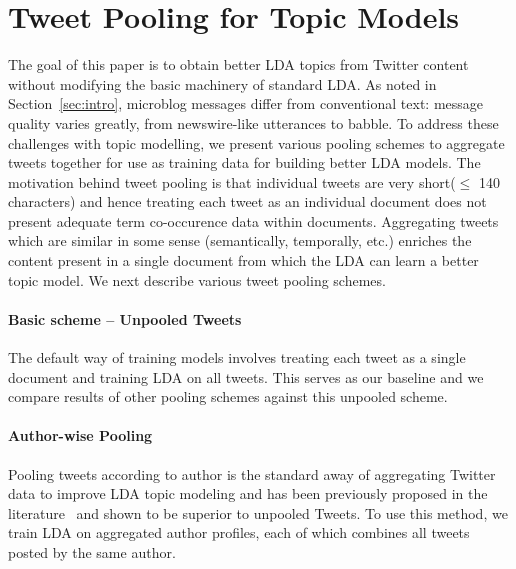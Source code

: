 \documentclass{sig-alternate}
\begin{document}

\section{Tweet Pooling for Topic Models}

The goal of this paper is to obtain better LDA topics from Twitter
content without modifying the basic machinery of standard LDA.  As
noted in Section~\ref{sec:intro}, microblog messages differ from
conventional text: message quality varies greatly, from newswire-like
utterances to babble. 
To address these challenges with topic modelling,
 we present various pooling schemes to
aggregate tweets together for use as training data for building better
LDA models. The motivation behind tweet pooling is that individual
tweets are very short($\leq$ 140 characters) and hence treating each
tweet as an individual document does not present adequate term
co-occurence data within documents.  
Aggregating tweets which are similar in some sense
(semantically, temporally, etc.) enriches the content present in a
single document from which the LDA can learn a better topic model.  We
next describe various tweet
pooling schemes.

\paragraph{Basic scheme -- Unpooled Tweets}
The default way of training models involves treating each tweet as a
single document and training LDA on all tweets. This serves as our
baseline and we compare results of other pooling schemes against this
unpooled scheme. 

\paragraph{Author-wise Pooling}
Pooling tweets according to author is the standard away of aggregating
Twitter data to improve LDA topic modeling and has been previously
proposed in the literature~\cite{Weng2010wsdm,hong} and shown to be
superior to unpooled Tweets.  To use this method, we train LDA on
aggregated author profiles, each of which combines all tweets posted
by the same author.  
\end{document}
